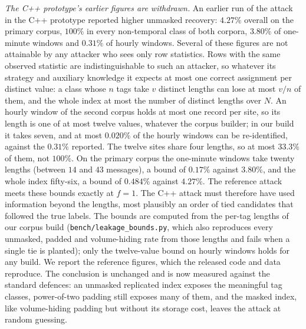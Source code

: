 \documentclass[a4paper,fleqn]{cas-sc}
\newif\ifauthorchecks
\newcommand{\authorcheck}[1]{\ifauthorchecks{\color{red}\textsf{[Authors: #1]}}\fi}
\begin{document}
\emph{The C++ prototype's earlier figures are withdrawn.} An earlier run of the
attack in the C++ prototype reported higher unmasked recovery: $4.27\%$
overall on the primary corpus, $100\%$ in every non-temporal class of both
corpora, $3.80\%$ of one-minute windows and $0.31\%$ of hourly windows. Several
of these figures are not attainable by any attacker who sees only row
statistics. Rows with the same observed statistic are indistinguishable to such
an attacker, so whatever its strategy and auxiliary knowledge it expects at
most one correct assignment per distinct value: a class whose $n$ tags take
$v$ distinct lengths can lose at most $v/n$ of them, and the whole index at
most the number of distinct lengths over $N$. An hourly window of the second
corpus holds at most one record per site, so its length is one of at most
twelve values, whatever the corpus builder; in our build it takes seven, and at
most $0.020\%$ of the hourly windows can be re-identified, against the $0.31\%$
reported. The twelve sites share four lengths, so at most $33.3\%$ of them, not
$100\%$. On the primary corpus the one-minute windows take twenty lengths
(between $14$ and $43$ messages), a bound of $0.17\%$ against $3.80\%$, and the
whole index fifty-six, a bound of $0.484\%$ against $4.27\%$. The reference
attack meets these bounds exactly at $f=1$. The C++ attack must therefore have
used information beyond the lengths, most plausibly an order of tied
candidates that followed the true labels. The bounds are computed from the
per-tag lengths of our corpus build (\texttt{bench/leakage\_bounds.py}, which
also reproduces every unmasked, padded and volume-hiding rate from those
lengths and fails when a single tie is planted); only the twelve-value bound on
hourly windows holds for any build. We report the reference figures, which the
released code and data reproduce. The conclusion
is unchanged and is now measured against the standard defences: an unmasked
replicated index exposes the meaningful tag classes, power-of-two padding
still exposes many of them, and the masked index, like volume-hiding padding
but without its storage cost, leaves the attack at random guessing.
\authorcheck{If the C++ prototype is released, check its attack's
tie-breaking and compare its per-tag lengths with results/lengths\_*.csv.gz.}
\end{document}
